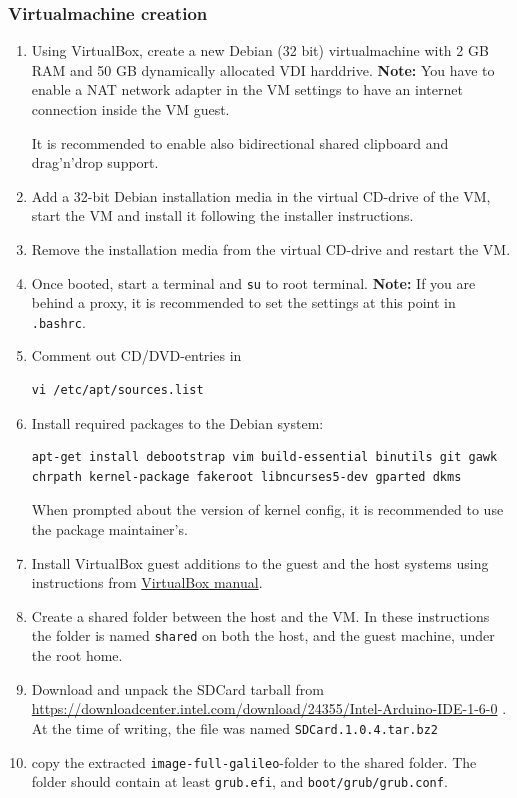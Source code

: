 \documentclass[a4paper,11pt]{article}
\newcommand{\note}{\textbf{Note: }}
\newcommand{\cmd}[1]{\texttt{#1}}
\begin{document}
\subsubsection*{Virtualmachine creation}
\begin{enumerate}
\item Using VirtualBox, create a new Debian (32 bit) virtualmachine with 2 GB RAM and 50 GB dynamically allocated VDI harddrive. \note You have to enable a NAT network adapter in the VM settings to have an internet connection inside the VM guest. 

It is recommended to enable also bidirectional shared clipboard and drag'n'drop support.

\item Add a 32-bit Debian installation media in the virtual CD-drive of the VM, start the VM and install it following the installer instructions.

\item Remove the installation media from the virtual CD-drive and restart the VM.

\item Once booted, start a terminal and \cmd{su} to root terminal. \note If you are behind a proxy, it is recommended to set the settings at this point in \cmd{.bashrc}.

\item Comment out CD/DVD-entries in 
\begin{lstlisting}
vi /etc/apt/sources.list
\end{lstlisting}

\item Install required packages to the Debian system: 
\begin{lstlisting}
apt-get install debootstrap vim build-essential binutils git gawk chrpath kernel-package fakeroot libncurses5-dev gparted dkms
\end{lstlisting}

When prompted about the version of kernel config, it is recommended to use the package maintainer's.

\item Install VirtualBox guest additions to the guest and the host systems using instructions from \href{https://www.virtualbox.org/manual/ch04.html}{VirtualBox manual}.

\item Create a shared folder between the host and the VM. In these instructions the folder is named \cmd{shared} on both the host, and the guest machine, under the root home.

\item Download and unpack the SDCard tarball from \url{https://downloadcenter.intel.com/download/24355/Intel-Arduino-IDE-1-6-0} . At the time of writing, the file was named \cmd{SDCard.1.0.4.tar.bz2}

\item copy the extracted \cmd{image-full-galileo}-folder to the shared folder. The folder should contain at least \cmd{grub.efi}, and \cmd{boot/grub/grub.conf}.
\end{enumerate}
\end{document}
